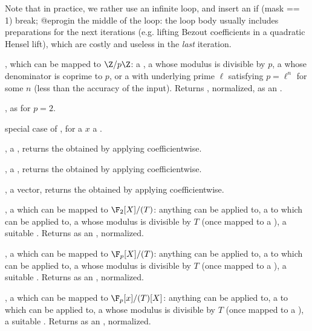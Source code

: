 Note that in practice, we rather use an infinite loop, and insert an
\bprog
  if (mask == 1) break;
@eprog\noindent in the middle of the loop: the loop body usually includes
preparations for the next iterations (e.g. lifting Bezout coefficients
in a quadratic Hensel lift), which are costly and useless in the \emph{last}
iteration.



,  which can be mapped to
$\Z/p\Z$: a , a  whose modulus is divisible by $p$,
a  whose denominator is coprime to $p$, or a  with
underlying prime $\ell$ satisfying $p = \ell^n$ for some $n$ (less than the
accuracy of the input). Returns , normalized, as an
.

, as  for $p = 2$.

 special case of ,
for a $x$ a .

,  a , returns the
 obtained by applying  coefficientwise.

,  a , returns the
 obtained by applying  coefficientwise.

,  a vector, returns the
 obtained by applying  coefficientwise.

,  a  which can be
mapped to $\F_2[X]/(T)$: anything  can be applied to,
a  to which  can be applied to, a 
whose modulus is divisible by $T$ (once mapped to a ), a suitable
. Returns  as an , normalized.

,  a  which can be
mapped to $\F_p[X]/(T)$: anything  can be applied to,
a  to which  can be applied to, a 
whose modulus is divisible by $T$ (once mapped to a ), a suitable
. Returns  as an , normalized.

,  a  which can be
mapped to $\F_p[x]/(T)[X]$: anything  can be applied to,
a  to which  can be applied to, a 
whose modulus is divisible by $T$ (once mapped to a ), a suitable
. Returns  as an , normalized.

